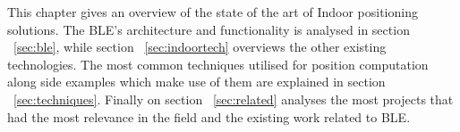 
\label{cap:indoor}

This chapter gives an overview of the state of the art of Indoor positioning solutions. The \acf{BLE}'s architecture and functionality is analysed in section ~\ref{sec:ble}, while section ~\ref{sec:indoortech} overviews the other existing technologies. The most common techniques utilised for position computation along side examples which make use of them are explained in section ~\ref{sec:techniques}. Finally on section ~\ref{sec:related} analyses the most projects that had the most relevance in the field and the existing work related to \ac{BLE}.








\cleardoublepage
